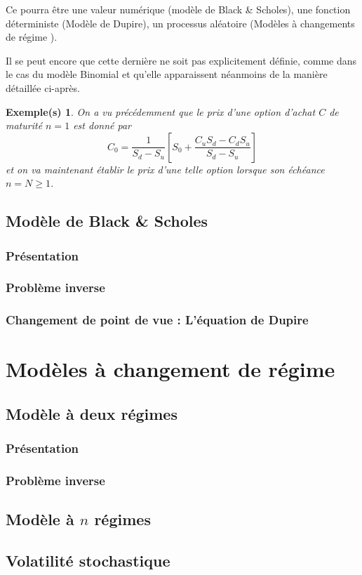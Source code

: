 \documentclass[a4paper]{book}
\newtheorem{ex}{Exemple(s)}[chapter]
\begin{document}
Ce pourra être une valeur numérique (modèle de Black \& Scholes), une fonction déterministe (Modèle de Dupire), un processus aléatoire (Modèles à changements de régime ).

Il se peut encore que cette dernière ne soit pas explicitement définie, comme dans le cas du modèle Binomial et qu'elle apparaissent néanmoins de la manière détaillée ci-après.

\begin{ex}
    On a vu précédemment que le prix d'une option d'achat $C$ de maturité $n=1$ est donné par
    \[C_0=\frac{1}{S_d-S_u}\left[S_0+ \frac{C_uS_d-C_dS_u}{S_d-S_u} \right] \]
    et on va maintenant établir le prix d'une telle option lorsque son échéance $n=N\geq 1$.
\end{ex}
\chapter{Modèle de Black \& Scholes}
\section{Présentation}
\section{Problème inverse}
\section{Changement de point de vue : L'équation de Dupire}
\part{Modèles à changement de régime}
\chapter{Modèle à deux régimes}
\section{Présentation}
\section{Problème inverse}
\chapter{Modèle à $n$ régimes}
\chapter{Volatilité stochastique}
\end{document}
